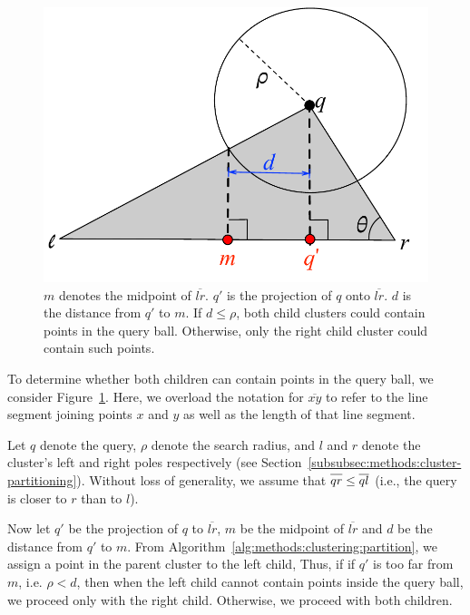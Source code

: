 \begin{figure}[ht!]
    \centering
    \includegraphics[scale=0.5]{images/geometry/overlapping-children-3.pdf}
    \caption{
        $m$ denotes the midpoint of $\overline{l r}$. $q'$ is the projection of $q$ onto $\overline{l r}$.
        $d$ is the distance from $q'$ to $m$.
        If $d \leq \rho$, both child clusters could contain points in the query ball.
        Otherwise, only the right child cluster could contain such points. 
    }
    \label{fig:methods:overlapping-children-3}
\end{figure}

To determine whether both children can contain points in the query ball, we consider Figure~\ref{fig:methods:overlapping-children-3}.
Here, we overload the notation for $\overline{x y}$ to refer to the line segment joining points $x$ and $y$ as well as the length of that line segment.

Let $q$ denote the query, $\rho$ denote the search radius, and $l$ and $r$ denote the cluster's left and right poles respectively (see Section~\ref{subsubsec:methods:cluster-partitioning}).
Without loss of generality, we assume that $\overline{q r \vphantom{l}} \leq \overline{q l}$ (i.e., the query is closer to $r$ than to $l$).

Now let $q'$ be the projection of $q$ to $\overline{l r}$, $m$ be the midpoint of $\overline{l r}$ and $d$ be the distance from $q'$ to $m$.
From Algorithm~\ref{alg:methods:clustering:partition}, we assign a point in the parent cluster to the left child,
Thus, if if $q'$ is too far from $m$, i.e. $\rho < d$, then when the left child cannot contain points inside the query ball, we proceed only with the right child.
Otherwise, we proceed with both children.

